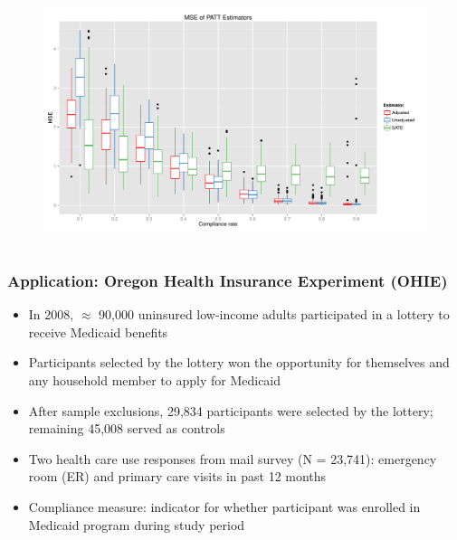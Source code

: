 \documentclass{beamer}
\begin{document}
\begin{frame}
\begin{figure}[htbp]
\centering
   \includegraphics[width=\linewidth]{../paper/mse_boxplots_B5.pdf} 
\label{simulation-plot}
\end{figure}
\end{frame}



\section[Application]{}

\begin{frame}
\frametitle{Application: Oregon Health Insurance Experiment (OHIE)}
\begin{itemize}
\item In 2008, $\approx$ 90,000 uninsured low-income adults participated in a lottery to receive Medicaid benefits \citep{finkelstein2012}
\item Participants selected by the lottery won the opportunity for themselves and any household member to apply for Medicaid
\item After sample exclusions, 29,834 participants were selected by the lottery; remaining 45,008 served as controls 
\item Two health care use responses from mail survey (N = 23,741): emergency room (ER) and primary care visits in past 12 months
\item Compliance measure: indicator for whether participant was enrolled in Medicaid program during study period
\end{itemize}
\end{frame}
\end{document}
